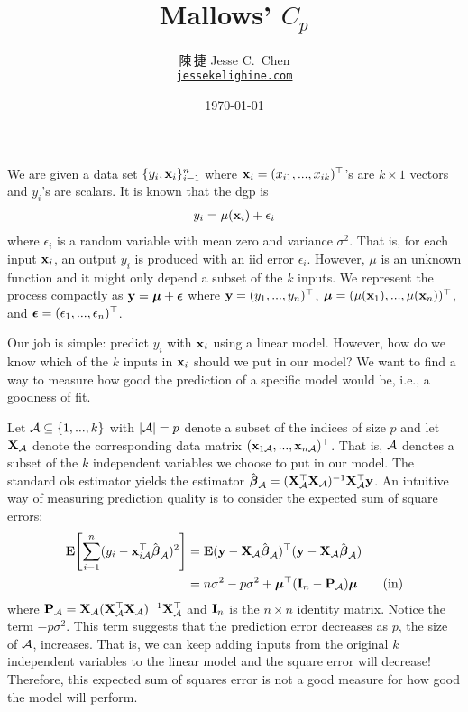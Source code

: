\documentclass[a4paper]{article}
\title{Mallows' $C_p$}
\author{陳\,捷 Jesse C.\ Chen\\\texttt{\href{https://jessekelighine.com}{jessekelighine.com}}}
\date{\today}
\begin{document}
\maketitle

\noindent
We are given a data set $\{y_{i},\xx_{i}\}_{i=1}^{n}$
where $\xx_{i}=(x_{i1},...,x_{ik})\T$'s are $k\times 1$ vectors and $y_{i}$'s are scalars.
It is known that the \gls*{dgp} is
\begin{gather*}
	y_{i} = \mu(\xx_{i}) + \epsilon_{i}
\end{gather*}
where $\epsilon_{i}$ is a random variable with mean zero and variance $\sigma^2$.
That is, for each input $\xx_{i}$, an output $y_i$ is produced with an \gls*{iid} error $\epsilon_i$.
However, $\mu$ is an unknown function and it might only depend a subset of the $k$ inputs.
We represent the process compactly as $\yy=\mmu+\eepsilon$ where
$\yy=(y_{1},...,y_{n})\T$,
$\mmu=(\mu(\xx_{1}),...,\mu(\xx_{n}))\T$, and
$\eepsilon=(\epsilon_{1},...,\epsilon_{n})\T$.

Our job is simple: predict $y_{i}$ with $\xx_{i}$ using a linear model.
However, how do we know which of the $k$ inputs in $\xx_{i}$ should we put in our model?
We want to find a way to measure how good the prediction of a specific model would be, i.e.,
a goodness of fit.

Let $\AA\subseteq\{1,...,k\}$ with $|\AA|=p$ denote a subset of the indices of size $p$
and let $\XX_{\AA}$ denote the corresponding data matrix $(\xx_{1\AA},...,\xx_{n\AA})\T$.
That is, $\AA$ denotes a subset of the $k$ independent variables we choose to put in our model.
The standard \gls*{ols} estimator yields the estimator $\hat\bbeta_{\AA}=(\XX_{\AA}\T\XX_{\AA})\inv\XX_{\AA}\T\yy$.
An intuitive way of measuring prediction quality is to consider the expected sum of square errors:
\begin{align}\label{eq:in-sample}
	\E\!\left[ \sum_{i=1}^{n} ( y_{i} - \xx_{i\AA}\T\hat\bbeta_{\AA} )^{2} \right]
	&= \E (\yy-\XX_{\AA}\hat\bbeta_{\AA})\T(\yy-\XX_{\AA}\hat\bbeta_{\AA}) \nonumber\\
	&= n\sigma^{2} - p\sigma^{2} + \mmu\T(\II_n-\PP_{\AA})\mmu \tag{in}
\end{align}
where $\PP_{\AA}=\XX_{\AA}(\XX_{\AA}\T\XX_{\AA})\inv\XX_{\AA}\T$ and $\II_n$ is the $n\times n$ identity matrix.
Notice the term $-p\sigma^{2}$.
This term suggests that the prediction error decreases as $p$, the size of $\AA$, increases.
That is, we can keep adding inputs from the original $k$ independent variables to the linear model
and the square error will decrease!
Therefore, this expected sum of squares error is not a good measure for how good the model will perform.
\end{document}

